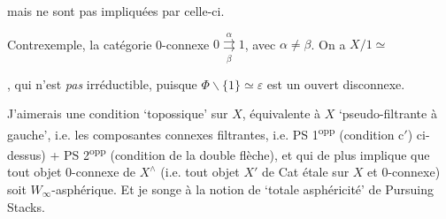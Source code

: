 
\noindent mais ne sont pas impliquées par celle-ci.

Contrexemple, la catégorie 0-connexe $0 \underset{\beta}{\overset{\alpha}{\rightrightarrows}} 1$, avec $\alpha \neq \beta$. On a $X/1 \simeq$
, qui n'est \textit{pas} irréductible, puisque $\Phi \backslash \{1\} \simeq \varepsilon$ est un ouvert disconnexe.

J'aimerais une condition `topossique' sur $X$, équivalente à $X$ `pseudo-filtrante à gauche', i.e. les composantes connexes filtrantes, i.e. PS 1\textsuperscript{opp} (condition c$'$) ci-dessus) + PS 2\textsuperscript{opp} (condition de la double flèche), et qui de plus implique que tout objet 0-connexe de $X^{\wedge}$ (i.e. tout objet $X'$ de Cat étale sur $X$ et 0-connexe) soit $W_{\infty}$-asphérique. Et je songe à la notion de `totale asphéricité' de Pursuing Stacks.


